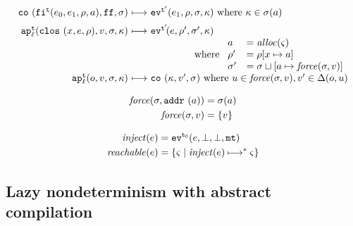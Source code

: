 \documentclass{llncs}
\begin{document}
\begin{gather*}
\begin{array}{@{}r@{\ }c@{\ }l@{}}
\co{\kif[^\mcntr]{\mexpi0,\mexpi1,\menv,\maddr},\sfalse,\msto} & \machstep&
\ev[^{\mcntr'}]{\mexpi1,\menv,\msto,\mkont}
\text{ where }\mkont\in\msto(\maddr)
\\[2mm]
\ap[^\mcntr_\mlab]{\clos{\mvar,\mexp,\menv},\mval,\msto,\mkont} & \machstep&
\ev[^{\mcntr'}\!]{\mexp,\menv',\msto',\mkont}
\\
\multicolumn{3}{r@{}}{
\text{ where }
\begin{array}{ll}
 \maddr &= \alloc(\mstate) \\
 \menv' &= \menv[\mvar \mapsto \maddr] \\
 \msto' &= \msto\sqcup[\maddr \mapsto \spchoice{\force(\msto, \mval)}{\force(\mval)}]
\end{array}}
\\
\ap[^\mcntr_\mlab]{\mop,\mval,\msto,\mkont} & \machstep&
\co{\mkont,\mval',\msto}
\text{ where } \mvalx{u} \in \spchoice{\force(\msto, \mval)}{\force(\mval)}, \mval'\in\interpdelta(\mop,\mvalx{u})
\end{array}
\end{gather*}

\begin{align*}
\spchoice
{\force(\msto,\saddr\maddr) &= \msto(\maddr) \\
 \force(\msto,\mval) &= \{ \mval \}}
{\force(\superposition{\mval{s}}) &= \mval{s} \\
 \force(\mval) &= \{ \mval \}}
\end{align*}

\begin{align*}
\inject(\mexp) &= \ev[^\mtcntr]{\mexp,\bot,\bot,\kmt} \\
\reachable{\mexp} &= \setof{\mstate \mid \inject(\mexp) \machstep^* \mstate}
\end{align*}

\subsection{Lazy nondeterminism with abstract compilation}
\end{document}
